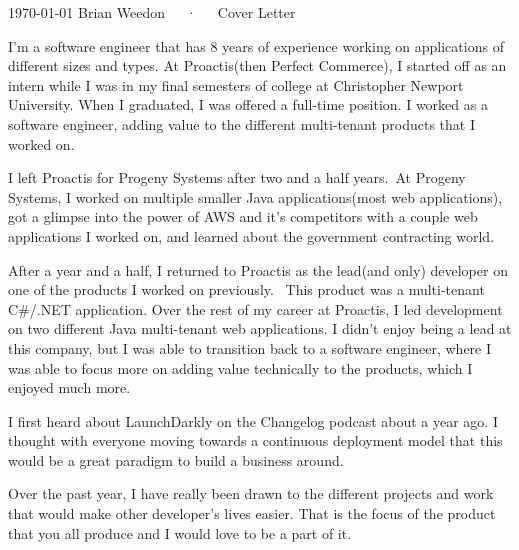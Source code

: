\documentclass[11pt, a4paper]{awesome-cv}
\begin{document}
\makecvheader[C]

\makecvfooter
{\today}
{Brian Weedon~~~·~~~Cover Letter}
{}

\makelettertitle

\begin{cvletter}

    I'm a software engineer that has 8 years of experience working on applications of different sizes and types. At Proactis(then Perfect Commerce), I started off as an intern while I was in my final semesters of college at Christopher Newport University. When I graduated, I was offered a full-time position. I worked as a software engineer, adding value to the different multi-tenant products that I worked on. 

    I left Proactis for Progeny Systems after two and a half years. At Progeny Systems, I worked on multiple smaller Java applications(most web applications), got a glimpse into the power of AWS and it's competitors with a couple web applications I worked on, and learned about the government contracting world. 

    After a year and a half, I returned to Proactis as the lead(and only) developer on one of the products I worked on previously.  This product was a multi-tenant C\#/.NET application. Over the rest of my career at Proactis, I led development on two different Java multi-tenant web applications. I didn't enjoy being a lead at this company, but I was able to transition back to a software engineer, where I was able to focus more on adding value technically to the products, which I enjoyed much more.

    I first heard about LaunchDarkly on the Changelog podcast about a year ago. I thought with everyone moving towards a continuous deployment model that this would be a great paradigm to build a business around.  

    Over the past year, I have really been drawn to the different projects and work that would make other developer’s lives easier. That is the focus of the product that you all produce and I would love to be a part of it. 


\end{cvletter}
\end{document}
